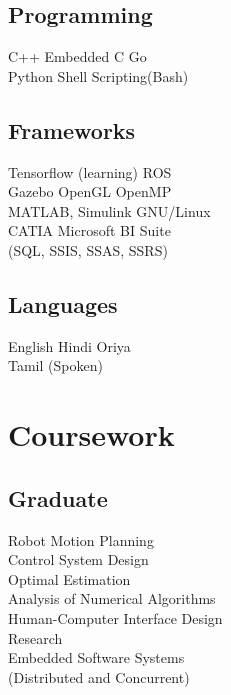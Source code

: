 \documentclass[]{deedy-resume-openfont}
\begin{document}
\begin{minipage}[t]{0.33\textwidth}
\sectionsep

\subsection{Programming}

C++ \textbullet{} Embedded C \textbullet{} Go\\
Python \textbullet{} Shell Scripting(Bash)

\sectionsep

\subsection{Frameworks}

Tensorflow (learning) \textbullet{} ROS \\
Gazebo \textbullet{}  OpenGL \textbullet{} OpenMP \\
MATLAB, Simulink \textbullet{}  GNU/Linux \\
CATIA \textbullet{} Microsoft BI Suite \\
(SQL, SSIS, SSAS, SSRS)\\

\sectionsep

\subsection{Languages}
English \textbullet{} Hindi \textbullet{} Oriya \\
Tamil (Spoken)


\sectionsep
\section{Coursework}

\sectionsep

\subsection{Graduate}
Robot Motion Planning\\
Control System Design\\
Optimal Estimation\\
Analysis of Numerical Algorithms\\
Human-Computer Interface Design \\ Research\\
Embedded Software Systems\\
(Distributed and Concurrent)


\end{minipage}
\end{document}
